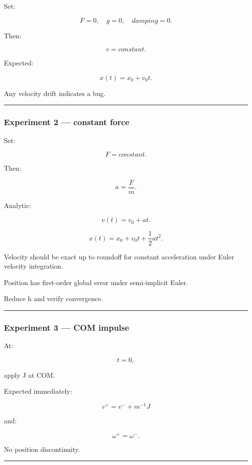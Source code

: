 Set:

\[
F=0,
\quad
g=0,
\quad
damping=0.
\]

Then:

\[
v=constant.
\]

Expected:

\[
x(t)
=
x_0+v_0t.
\]

Any velocity drift indicates a bug.

\begin{center}\rule{0.5\linewidth}{0.5pt}\end{center}

\subsubsection{Experiment 2 --- constant force}\label{experiment-2-constant-force}

Set:

\[
F=constant.
\]

Then:

\[
a=\frac Fm.
\]

Analytic:

\[
v(t)=v_0+at.
\]

\[
x(t)
=
x_0+
v_0t+
\frac12at^2.
\]

Velocity should be exact up to roundoff for constant acceleration under Euler velocity integration.

Position has first-order global error under semi-implicit Euler.

Reduce h and verify convergence.

\begin{center}\rule{0.5\linewidth}{0.5pt}\end{center}

\subsubsection{Experiment 3 --- COM impulse}\label{experiment-3-com-impulse}

At:

\[
t=0,
\]

apply J at COM.

Expected immediately:

\[
v^+
=
v^-+
m^{-1}J
\]

and:

\[
\omega^+=\omega^-.
\]

No position discontinuity.

\begin{center}\rule{0.5\linewidth}{0.5pt}\end{center}

